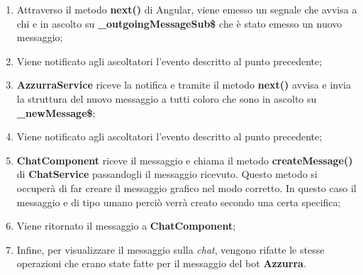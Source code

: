 \begin{enumerate}
	\item Attraverso il metodo \textbf{next()} di Angular, viene emesso un segnale che avvisa a chi e in ascolto su \textbf{\_outgoingMessageSub\$} che è stato emesso un nuovo messaggio;
	\item Viene notificato agli ascoltatori l'evento descritto al punto precedente;
	\item \textbf{AzzurraService} riceve la notifica e tramite il metodo \textbf{next()} avvisa e invia la struttura del nuovo messaggio a tutti coloro che sono in ascolto su \textbf{\_newMessage\$};
	\item Viene notificato agli ascoltatori l'evento descritto al punto precedente;
	\item \textbf{ChatComponent} riceve il messaggio e chiama il metodo \textbf{createMessage()} di \textbf{ChatService} passandogli il messaggio ricevuto. Questo metodo si occuperà di far creare il messaggio grafico nel modo corretto. In questo caso il messaggio e di tipo umano perciò verrà creato secondo una certa specifica;
	\item Viene ritornato il messaggio a \textbf{ChatComponent};
	\item Infine, per visualizzare il messaggio sulla \emph{chat}, vengono rifatte le stesse operazioni che erano state fatte per il messaggio del bot \textbf{Azzurra}.
\end{enumerate}